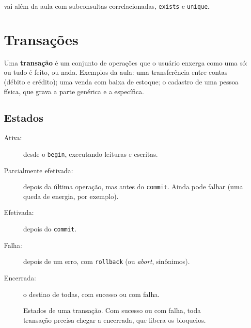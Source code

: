 \textcite[seção 5.1]{Elmasri2011} vai além da aula com subconsultas
correlacionadas, \texttt{exists} e \texttt{unique}.

\section{Transações}

Uma \textbf{transação} é um conjunto de operações que o
usuário enxerga como uma só: ou tudo é feito, ou nada. Exemplos da aula:
uma transferência entre contas (débito e crédito); uma venda com baixa
de estoque; o cadastro de uma pessoa física, que grava a parte genérica
e a específica.

\subsection{Estados}

\begin{description}
	\item[Ativa:] desde o \texttt{begin}, executando leituras e escritas.
	\item[Parcialmente efetivada:] depois da última operação, mas antes do
	\texttt{commit}. Ainda pode falhar (uma queda de energia, por
	exemplo).
	\item[Efetivada:] depois do \texttt{commit}.
	\item[Falha:] depois de um erro, com \texttt{rollback} (ou
	\emph{abort}, sinônimos).
	\item[Encerrada:] o destino de todas, com sucesso ou com falha.
\end{description}

\begin{figure}[h]
\centering
{}
\caption{Estados de uma transação. Com sucesso ou com falha, toda
transação precisa chegar a encerrada, que libera os bloqueios.}
\end{figure}

